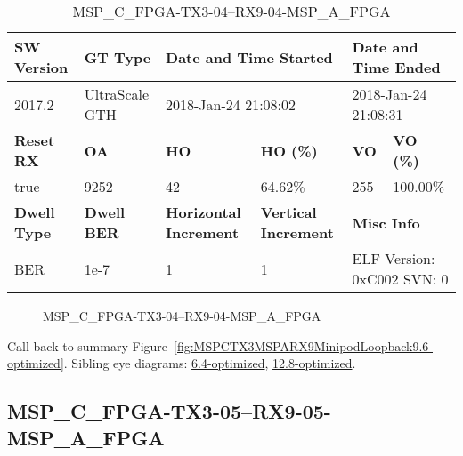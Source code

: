 \begin{table}[h]
\centering
\caption{MSP\_C\_FPGA-TX3-04--RX9-04-MSP\_A\_FPGA}
\label{tab:MSPCFPGATX304RX904MSPAFPGA9.6-optimized}
\begin{tabular}{@{}|l|l|l|l|l|l|@{}}
\toprule
\textbf{SW Version}                & \textbf{GT Type}   & \multicolumn{2}{l|}{\textbf{Date and Time Started}}            & \multicolumn{2}{l|}{\textbf{Date and Time Ended}}        \\ \midrule
2017.2                       & UltraScale GTH          & \multicolumn{2}{l|}{2018-Jan-24 21:08:02}                   & \multicolumn{2}{l|}{2018-Jan-24 21:08:31}               \\ \midrule
\textbf{Reset RX}                  & \textbf{OA} & \textbf{HO}   & \textbf{HO (\%)} & \textbf{VO} & \textbf{VO (\%)} \\ \midrule
true & 9252        & 42          & 64.62\%        & 255        & 100.00\%       \\ \midrule
\textbf{Dwell Type}                & \textbf{Dwell BER} & \textbf{Horizontal Increment} & \textbf{Vertical Increment}    & \multicolumn{2}{l|}{\textbf{Misc Info}}                  \\ \midrule
BER                            & 1e-7        & 1        & 1           & \multicolumn{2}{l|}{ELF Version: 0xC002 SVN: 0}                         \\ \bottomrule
\end{tabular}
\end{table}

\begin{figure}[h]
\caption{MSP\_C\_FPGA-TX3-04--RX9-04-MSP\_A\_FPGA} \label{fig:MSPCFPGATX304RX904MSPAFPGA9.6-optimized}
\end{figure}

Call back to summary Figure~\ref{fig:MSPCTX3MSPARX9MinipodLoopback9.6-optimized}.
Sibling eye diagrams: \hyperref[sec:MSPCFPGATX304RX904MSPAFPGA6.4-optimized]{6.4-optimized}, \hyperref[sec:MSPCFPGATX304RX904MSPAFPGA12.8-optimized]{12.8-optimized}.

\clearpage
\newpage


\subsection{MSP\_C\_FPGA-TX3-05--RX9-05-MSP\_A\_FPGA}\label{sec:MSPCFPGATX305RX905MSPAFPGA9.6-optimized}

